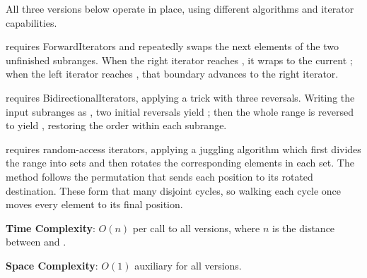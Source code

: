 All three versions below operate in place, using different algorithms and iterator capabilities.

\begin{compactitem}
  \item {} requires ForwardIterators and repeatedly swaps the next elements of the two unfinished subranges. When the right iterator reaches , it wraps to the current ; when the left iterator reaches , that boundary advances to the right iterator.
  \item {} requires BidirectionalIterators, applying a trick with three reversals. Writing the input subranges as , two initial reversals yield ; then the whole range is reversed to yield , restoring the order within each subrange.
  \item {} requires random-access iterators, applying a juggling algorithm which first divides the range into  sets and then rotates the corresponding elements in each set. The method follows the permutation that sends each position to its rotated destination. These form that many disjoint cycles, so walking each cycle once moves every element to its final position.
\end{compactitem}

\textbf{Time Complexity}: $O(n)$ per call to all versions, where $n$ is the distance between  and .

\textbf{Space Complexity}: $O(1)$ auxiliary for all versions.


